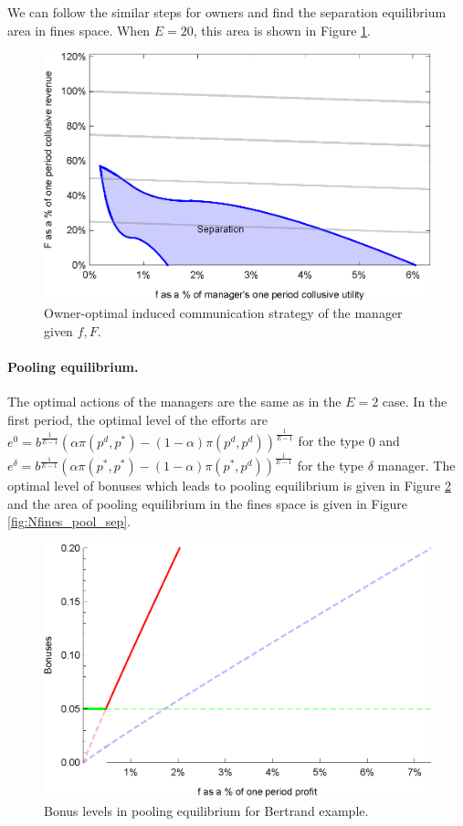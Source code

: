 \documentclass[]{article}
\begin{document}
We can follow the similar steps for owners and find the separation equilibrium area in fines space. When $E=20$, this area is shown in Figure \ref{fig:Nfines}.

\begin{figure}[ht]
\centering
\includegraphics[scale=0.8]{Plots/Bertrand_N_sep_f_F.eps}
\caption{Owner-optimal induced communication strategy of the manager given $f,F$.}\label{fig:Nfines}
\end{figure}

\paragraph{Pooling equilibrium.} The optimal actions of the managers are the same as in the $E=2$ case. In the first period, the optimal level of the efforts are $e^0=b^\frac{1}{E-1}(\alpha \pi(p^d,p^*)-(1-\alpha) \pi(p^d,p^d))^\frac{1}{E-1}$ for the type $0$ and $e^\delta=b^\frac{1}{E-1}(\alpha \pi(p^*,p^*)-(1-\alpha) \pi(p^*,p^d))^\frac{1}{E-1}$ for the type $\delta$ manager. The optimal level of bonuses which leads to pooling equilibrium is given in Figure \ref{fig:Nbonuses_pooling} and the area of pooling equilibrium in the fines space is given in Figure \ref{fig:Nfines_pool_sep}.

\begin{figure}[ht]
\centering
\includegraphics[scale=0.8]{Plots/Bertrand_N_bonuses_diff_bonus_pool2.eps}
\caption{Bonus levels in pooling equilibrium for Bertrand example.}\label{fig:Nbonuses_pooling}
\end{figure}
\end{document}
